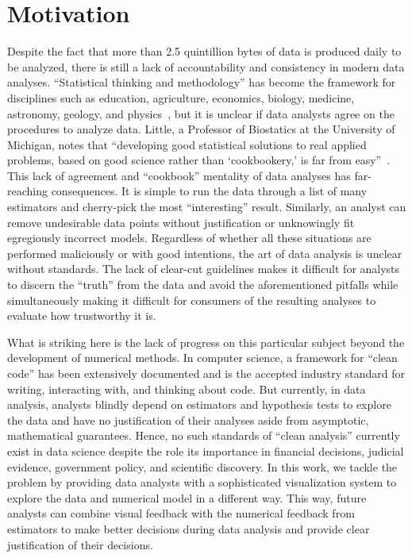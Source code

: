 \section{Motivation}
\label{sec:intro:motivation}

Despite the fact that more than 2.5 quintillion bytes of data is produced daily to be analyzed, there is still a lack of accountability and consistency in modern data analyses. ``Statistical thinking and methodology'' has become the framework for disciplines such as education, agriculture, economics, biology, medicine, astronomy, geology, and physics~\cite{efron1986}, but it is unclear if data analysts agree on the procedures to analyze data. Little, a Professor of Biostatics at the University of Michigan, notes that ``developing good statistical solutions to real applied problems, based on good science rather than `cookbookery,' is far from easy''~\cite{little2013}. This lack of agreement and ``cookbook'' mentality of data analyses has far-reaching consequences. It is simple to run the data through a list of many estimators and cherry-pick the most ``interesting'' result. Similarly, an analyst can remove undesirable data points without justification or unknowingly fit egregiously incorrect models. Regardless of whether all these situations are performed maliciously or with good intentions, the art of data analysis is unclear without standards. The lack of clear-cut guidelines makes it difficult for analysts to discern the ``truth'' from the data and avoid the aforementioned pitfalls while simultaneously making it difficult for consumers of the resulting analyses to evaluate how trustworthy it is. 

What is striking here is the lack of progress on this particular subject beyond the development of numerical methods. In computer science, a framework for ``clean code'' has been extensively documented and is the accepted industry standard for writing, interacting with, and thinking about code. But currently, in data analysis, analysts blindly depend on estimators and hypothesis tests to explore the data and have no justification of their analyses aside from asymptotic, mathematical guarantees. Hence, no such standards of ``clean analysis'' currently exist in data science despite the role its importance in financial decisions, judicial evidence, government policy, and scientific discovery. In this work, we tackle the problem by providing data analysts with a sophisticated visualization system to explore the data and numerical model in a different way. This way, future analysts can combine visual feedback with the numerical feedback from estimators to make better decisions during data analysis and provide clear justification of their decisions.
